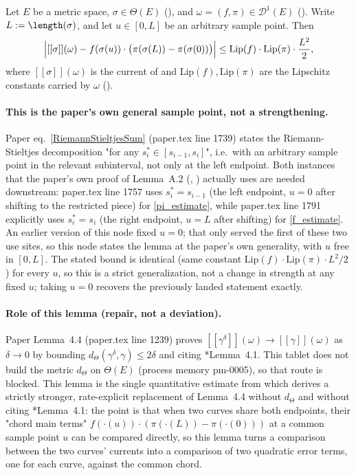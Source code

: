 \begin{lemma}
  Let $E$ be a metric space, $\sigma \in \Theta(E)$ (), and $\omega = (f,\pi) \in
  \mathcal{D}^1(E)$ (). Write $L := \length(\sigma)$, and let $u \in [0,L]$ be an
  arbitrary sample point. Then
  \[
    \Bigl| [[\sigma]](\omega) - f(\sigma(u)) \cdot \bigl(\pi(\sigma(L)) - \pi(\sigma(0))\bigr) \Bigr|
      \le \mathrm{Lip}(f) \cdot \mathrm{Lip}(\pi) \cdot \frac{L^2}{2}
    ,
  \]
  where $[[\sigma]](\omega)$ is the current of  and $\mathrm{Lip}(f),
  \mathrm{Lip}(\pi)$ are the Lipschitz constants carried by $\omega$ ().

  \paragraph{This is the paper's own general sample point, not a strengthening.} Paper
  eq.~\eqref{RiemannStieltjesSum} (paper.tex line 1739) states the Riemann-Stieltjes decomposition
  "for any $s_i^* \in [s_{i-1},s_i]$", i.e.\ with an arbitrary sample point in the relevant
  subinterval, not only at the left endpoint. Both instances that the paper's own proof of
  Lemma~A.2 (, ) actually uses are needed downstream:
  paper.tex line 1757 uses $s_i^* = s_{i-1}$ (the left endpoint, $u=0$ after shifting to the
  restricted piece) for \eqref{pi_estimate}, while paper.tex line 1791 explicitly uses
  $s_i^* = s_i$ (the right endpoint, $u=L$ after shifting) for \eqref{f_estimate}. An earlier
  version of this node fixed $u=0$; that only served the first of these two use sites, so this
  node states the lemma at the paper's own generality, with $u$ free in $[0,L]$. The stated bound
  is identical (same constant $\mathrm{Lip}(f)\cdot\mathrm{Lip}(\pi)\cdot L^2/2$) for every $u$, so
  this is a strict generalization, not a change in strength at any fixed $u$; taking $u=0$ recovers
  the previously landed statement exactly.

  \paragraph{Role of this lemma (repair, not a deviation).} Paper Lemma~4.4 (paper.tex line 1239)
  proves $[[\gamma^\delta]](\omega) \to [[\gamma]](\omega)$ as $\delta \to 0$ by bounding
  $d_\Theta(\gamma^\delta,\gamma) \le 2\delta$ and citing \cite{PS_2012}*{Lemma~4.1}. This tablet does
  not build the metric $d_\Theta$ on $\Theta(E)$ (process memory pm-0005), so that route is blocked.
  This lemma is the single quantitative estimate from which  derives
  a strictly stronger, rate-explicit replacement of Lemma~4.4 without $d_\Theta$ and without citing
  \cite{PS_2012}*{Lemma~4.1}: the point is that when two curves share both endpoints, their "chord
  main terms" $f(\cdot(u)) \cdot (\pi(\cdot(L)) - \pi(\cdot(0)))$ at a common sample point $u$ can be
  compared directly, so this lemma turns a comparison between the two curves' currents into a
  comparison of two quadratic error terms, one for each curve, against the common chord.
\end{lemma}
